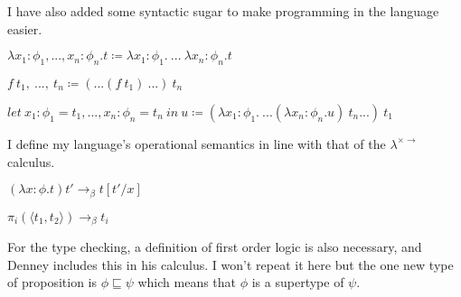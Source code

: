 I have also added some syntactic sugar to make programming in the language easier.

\begin{center}
    $\lambda x_1: \phi_1, ..., x_n: \phi_n . t \coloneqq \lambda x_1: \phi_1 .\ ...\ \lambda x_n: \phi_n . t$

    $f\ t_1,\ ...,\ t_n \coloneqq (...(f\ t_1)\ ...)\ t_n$

    $let\ x_1: \phi_1 = t_1, ..., x_n: \phi_n = t_n\ in\ u \coloneqq (\lambda x_1: \phi_1 .\ ...(\lambda x_n: \phi_n . u)\ t_n...)\ t_1$
\end{center}

I define my language's operational semantics in line with that of the $\lambda^{\times \rightarrow}$ calculus.

\begin{center}
    $(\lambda x: \phi . t) t' \rightarrow_\beta t[t'/x]$

    $\pi_i(\langle t_1, t_2 \rangle) \rightarrow_\beta t_i$
\end{center}

For the type checking, a definition of first order logic is also necessary, and Denney includes this
in his calculus.
I won't repeat it here but the one new type of proposition is $\phi \sqsubseteq \psi$ which means that
$\phi$ is a supertype of $\psi$.
